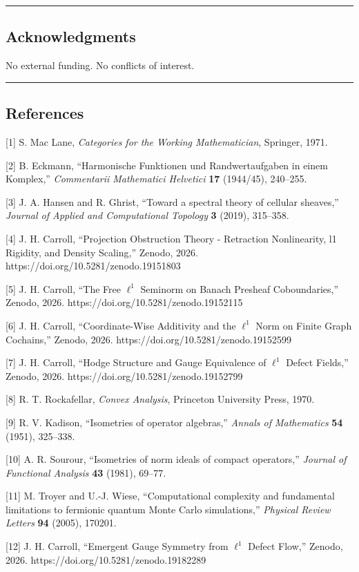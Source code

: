 \documentclass[
]{article}
\begin{document}
\begin{center}\rule{0.5\linewidth}{0.5pt}\end{center}

\subsection{Acknowledgments}\label{acknowledgments}

No external funding. No conflicts of interest.

\begin{center}\rule{0.5\linewidth}{0.5pt}\end{center}

\subsection{References}\label{references}

{[}1{]} S. Mac Lane, \emph{Categories for the Working Mathematician},
Springer, 1971.

{[}2{]} B. Eckmann, ``Harmonische Funktionen und Randwertaufgaben in
einem Komplex,'' \emph{Commentarii Mathematici Helvetici} \textbf{17}
(1944/45), 240--255.

{[}3{]} J. A. Hansen and R. Ghrist, ``Toward a spectral theory of
cellular sheaves,'' \emph{Journal of Applied and Computational Topology}
\textbf{3} (2019), 315--358.

{[}4{]} J. H. Carroll, ``Projection Obstruction Theory - Retraction
Nonlinearity, l1 Rigidity, and Density Scaling,'' Zenodo, 2026.
https://doi.org/10.5281/zenodo.19151803

{[}5{]} J. H. Carroll, ``The Free \(\ell^1\) Seminorm on Banach Presheaf
Coboundaries,'' Zenodo, 2026. https://doi.org/10.5281/zenodo.19152115

{[}6{]} J. H. Carroll, ``Coordinate-Wise Additivity and the \(\ell^1\)
Norm on Finite Graph Cochains,'' Zenodo, 2026.
https://doi.org/10.5281/zenodo.19152599

{[}7{]} J. H. Carroll, ``Hodge Structure and Gauge Equivalence of
\(\ell^1\) Defect Fields,'' Zenodo, 2026.
https://doi.org/10.5281/zenodo.19152799

{[}8{]} R. T. Rockafellar, \emph{Convex Analysis}, Princeton University
Press, 1970.

{[}9{]} R. V. Kadison, ``Isometries of operator algebras,'' \emph{Annals
of Mathematics} \textbf{54} (1951), 325--338.

{[}10{]} A. R. Sourour, ``Isometries of norm ideals of compact
operators,'' \emph{Journal of Functional Analysis} \textbf{43} (1981),
69--77.

{[}11{]} M. Troyer and U.-J. Wiese, ``Computational complexity and
fundamental limitations to fermionic quantum Monte Carlo simulations,''
\emph{Physical Review Letters} \textbf{94} (2005), 170201.

{[}12{]} J. H. Carroll, ``Emergent Gauge Symmetry from \(\ell^1\) Defect
Flow,'' Zenodo, 2026. https://doi.org/10.5281/zenodo.19182289
\end{document}
